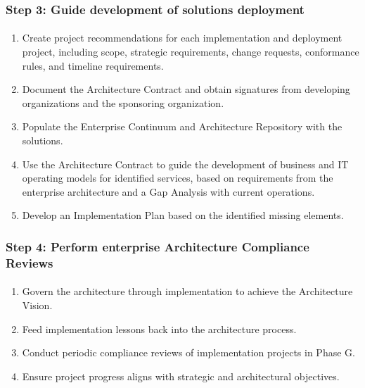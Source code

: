 \documentclass[aspectratio=169, table]{beamer}
\begin{document}
	\begin{frame}
		\frametitle{Step 3: Guide development of solutions deployment}
		\framesubtitle{\hspace{1cm}}
		\vspace{20pt}
		\begin{enumerate}
			\item Create project recommendations for each implementation and deployment project, including scope, strategic requirements, change requests, conformance rules, and timeline requirements.
			\item Document the Architecture Contract and obtain signatures from developing organizations and the sponsoring organization.
			\item Populate the Enterprise Continuum and Architecture Repository with the solutions.
			\item Use the Architecture Contract to guide the development of business and IT operating models for identified services, based on requirements from the enterprise architecture and a Gap Analysis with current operations.
			\item Develop an Implementation Plan based on the identified missing elements.
		\end{enumerate}
	\end{frame}
	
	\begin{frame}
		\frametitle{Step 4: Perform enterprise Architecture Compliance Reviews}
		\framesubtitle{\hspace{1cm}}
		\vspace{20pt}
		\begin{enumerate}
			\item Govern the architecture through implementation to achieve the Architecture Vision.
			\item Feed implementation lessons back into the architecture process.
			\item Conduct periodic compliance reviews of implementation projects in Phase G.
			\item Ensure project progress aligns with strategic and architectural objectives.
		\end{enumerate}
		
	\end{frame}
\end{document}
